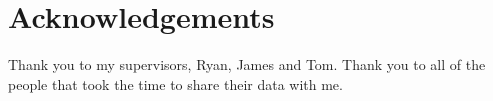 \chapter{Acknowledgements}
Thank you to my supervisors, Ryan, James and Tom. Thank you to all of the people that took the time to share their data with me.